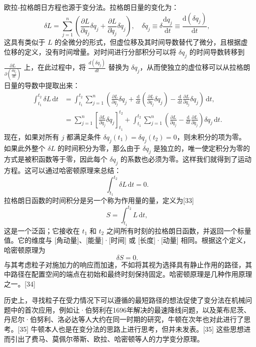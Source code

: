 欧拉-拉格朗日方程也源于变分法。拉格朗日量的变化为：
\[
\delta L = \sum_{j=1}^{n} \left( \frac{\partial L}{\partial q_{j}} \delta q_{j} + \frac{\partial L}{\partial \dot{q}_{j}} \delta \dot{q}_{j} \right), \quad \delta \dot{q}_{j} \equiv \delta \frac{\mathrm{d} q_{j}}{\mathrm{d} t} \equiv \frac{\mathrm{d} (\delta q_{j})}{\mathrm{d} t},~
\]
这具有类似于 \( L \) 的全微分的形式，但虚位移及其时间导数替代了微分，且根据虚位移的定义，没有时间增量。对时间进行分部积分可以将 \( \delta q_{j} \) 的时间导数转移到 \( \frac{\partial L}{\partial (\frac{dq_{j}}{dt})} \) 上，在此过程中，将 \( \frac{d(\delta q_{j})}{dt} \) 替换为 \( \delta q_{j} \)，从而使独立的虚位移可以从拉格朗日量的导数中提取出来：
\begin{equation}
\begin{aligned}
\int_{t_{1}}^{t_{2}} \delta L \, \mathrm{d} t &= \int_{t_{1}}^{t_{2}} \sum_{j=1}^{n} \left( \frac{\partial L}{\partial q_{j}} \delta q_{j} + \frac{\mathrm{d}}{\mathrm{d} t} \left( \frac{\partial L}{\partial \dot{q}_{j}} \delta q_{j} \right) - \frac{\mathrm{d}}{\mathrm{d} t} \frac{\partial L}{\partial \dot{q}_{j}} \delta q_{j} \right) \, \mathrm{d} t,\\
&= \sum_{j=1}^{n} \left[ \frac{\partial L}{\partial \dot{q}_{j}} \delta q_{j} \right]_{t_{1}}^{t_{2}} + \int_{t_{1}}^{t_{2}} \sum_{j=1}^{n} \left( \frac{\partial L}{\partial q_{j}} - \frac{\mathrm{d}}{\mathrm{d} t} \frac{\partial L}{\partial \dot{q}_{j}} \right) \delta q_{j} \, \mathrm{d} t.
\end{aligned}~
\end{equation}
现在，如果对所有 \( j \) 都满足条件 \( \delta q_{j}(t_{1}) = \delta q_{j}(t_{2}) = 0 \)，则未积分的项为零。如果此外整个 \( \delta L \) 的时间积分为零，那么由于 \( \delta q_{j} \) 是独立的，唯一使定积分为零的方式是被积函数等于零，因此每个 \( \delta q_{j} \) 的系数也必须为零。这样我们就得到了运动方程。这可以通过哈密顿原理来总结：
\[
\int_{t_{1}}^{t_{2}} \delta L \, \mathrm{d} t = 0.~
\]
拉格朗日函数的时间积分是另一个称为作用量的量，定义为[33]
\[
S = \int_{t_{1}}^{t_{2}} L \, \mathrm{d} t,~
\]
这是一个泛函；它接收在 \( t_{1} \) 和 \( t_{2} \) 之间所有时刻的拉格朗日函数，并返回一个标量值。它的维度与 [角动量]、[能量]·[时间] 或 [长度]·[动量] 相同。根据这个定义，哈密顿原理为
\[
\delta S = 0.~
\]
与其考虑粒子对施加力的响应而加速，不如将其视为选择具有静止作用的路径，其中路径在配置空间的端点在初始和最终时刻保持固定。哈密顿原理是几种作用原理之一。[34]

历史上，寻找粒子在受力情况下可以遵循的最短路径的想法促使了变分法在机械问题中的首次应用，例如让·伯努利在1696年解决的最速降线问题，以及莱布尼茨、丹尼尔·伯努利、洛必达等人大约在同一时期的研究，牛顿在次年也对此进行了思考。[35] 牛顿本人也是在变分法的思路上进行思考，但并未发表。[35] 这些思想进而引出了费马、莫佩尔蒂斯、欧拉、哈密顿等人的力学变分原理。


